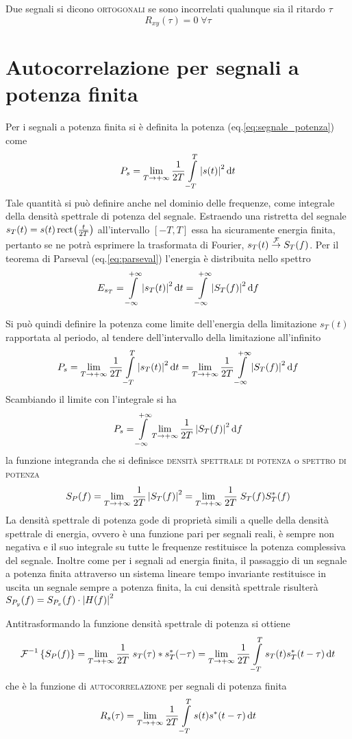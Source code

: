 Due segnali si dicono \textsc{ortogonali} se sono incorrelati qualunque sia il ritardo $\tau$
\[
	R_{xy}(\tau)=0\;\forall\tau
\]

\section{Autocorrelazione per segnali a potenza finita}
Per i segnali a potenza finita si è definita la potenza (eq.\ref{eq:segnale_potenza}) come
\[
	P_s=\lim\limits_{T\to+\infty}{\frac{1}{2T}\int\limits_{-T}^{T}{\left|{s(t)}\right|^2}{\,\mathop{}\!\mathrm{d}{t}}}
\]
Tale quantità si può definire anche nel dominio delle frequenze, come integrale della densità spettrale di potenza del segnale. Estraendo una ristretta del segnale $s_T(t)=s(t)\,{\operatorname{rect}}^{}\!\left({\frac{t}{2T}}\right)$ all'intervallo $[-T,T]$ essa ha sicuramente energia finita, pertanto se ne potrà esprimere la trasformata di Fourier, $s_T(t)\overset{\operatorname{\mathcal{F}}}{\to}S_T(f)$. Per il teorema di Parseval (eq.\ref{eq:parseval}) l'energia è distribuita nello spettro
\[
	E_{s_T}=\int\limits_{-\infty}^{+\infty}{\left|{s_T(t)}\right|^2}{\,\mathop{}\!\mathrm{d}{t}}=\int\limits_{-\infty}^{+\infty}{\left|{S_T(f)}\right|^2}{\,\mathop{}\!\mathrm{d}{f}}
\]

Si può quindi definire la potenza come limite dell'energia della limitazione $s_T(t)$ rapportata al periodo, al tendere dell'intervallo della limitazione all'infinito
\[
	P_s=\lim\limits_{T\to+\infty}{\frac{1}{2T}\int\limits_{-T}^{T}{\left|{s_T(t)}\right|^2}{\,\mathop{}\!\mathrm{d}{t}}}=\lim\limits_{T\to+\infty}{\frac{1}{2T}\int\limits_{-\infty}^{+\infty}{\left|{S_T(f)}\right|^2}{\,\mathop{}\!\mathrm{d}{f}}}
\]
Scambiando il limite con l'integrale si ha
\[
	P_s=\int\limits_{-\infty}^{+\infty}{\lim\limits_{T\to+\infty}\frac{1}{2T}\left|{S_T(f)}\right|^2}{\,\mathop{}\!\mathrm{d}{f}}
\]
la funzione integranda che si definisce \textsc{densità spettrale di potenza} o \textsc{spettro di potenza}
\begin{equation}
	S_P(f)=\lim\limits_{T\to+\infty}{\frac{1}{2T}\left|{S_T(f)}\right|^2}=\lim\limits_{T\to+\infty}{\frac{1}{2T}\;S_T(f)S_{T}^\ast(f)}
\end{equation}
La densità spettrale di potenza gode di proprietà simili a quelle della densità spettrale di energia, ovvero è una funzione pari per segnali reali, è sempre non negativa e il suo integrale su tutte le frequenze restituisce la potenza complessiva del segnale.
Inoltre come per i segnali ad energia finita, il passaggio di un segnale a potenza finita attraverso un sistema lineare tempo invariante restituisce in uscita un segnale sempre a potenza finita, la cui densità spettrale risulterà $S_{P_y}(f)=S_{P_x}(f)\cdot\left|{H(f)}\right|^2$

Antitrasformando la funzione densità spettrale di potenza si ottiene
\[
	\operatorname{\mathcal{F}}^{-1}\left\lbrace{S_P(f)}\right\rbrace=\lim\limits_{T\to+\infty}{\frac{1}{2T}\;s_T(\tau)\ast s_{T}^\ast(-\tau)}=\lim\limits_{T\to+\infty}{\frac{1}{2T}\int\limits_{-T}^{T}{s_T(t)s_{T}^\ast(t-\tau)}{\,\mathop{}\!\mathrm{d}{t}}}
\]
che è la funzione di \textsc{autocorrelazione} per segnali di potenza finita
\begin{equation}
	R_s(\tau)=\lim\limits_{T\to+\infty}{\frac{1}{2T}\int\limits_{-T}^{T}{s(t){s}^\ast(t-\tau)}{\,\mathop{}\!\mathrm{d}{t}}}
\end{equation}
